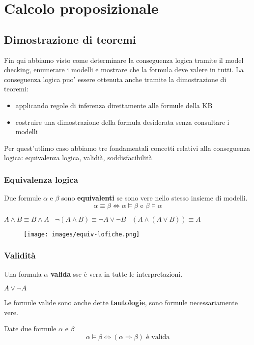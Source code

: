 \newpage
\section{Calcolo proposizionale}
\subsection{Dimostrazione di teoremi}
Fin qui abbiamo visto come determinare la conseguenza logica tramite il model checking,
enumerare i modelli e mostrare che la formula deve valere in tutti. La conseguenza logica puo’ essere ottenuta anche tramite la
dimostrazione di teoremi:
\begin{itemize}
    \item applicando regole di inferenza direttamente alle formule della KB
    \item costruire una dimostrazione della formula desiderata senza consultare i modelli
\end{itemize}
Per quest'utlimo caso abbiamo tre fondamentali concetti relativi alla conseguenza logica: equivalenza logica, validià, soddisfacibilità

\subsubsection{Equivalenza logica}
Due formule $\alpha$ e $\beta$ sono \textbf{equivalenti} se sono vere nello stesso insieme di modelli.
$$\alpha \equiv \beta \Leftrightarrow \alpha \models \beta \text{ e } \beta \models \alpha$$
\begin{example}
    $A \land B \equiv B \land A \hspace{10pt} \lnot(A \land B) \equiv \lnot A \lor \lnot B \hspace{10pt} (A \land (A \lor B)) \equiv A$ 
\end{example}
\begin{figure}[h!]
    \centering
    \texttt{[image: images/equiv-lofiche.png]}
\end{figure}

\subsubsection{Validità}
Una formula $\alpha$ \textbf{valida} sse è vera in tutte le interpretazioni.
\begin{example}
    $A \lor \lnot A$
\end{example}
\hspace{-15pt}Le formule valide sono anche dette \textbf{tautologie}, sono formule necessariamente vere.
\begin{theorem}
    Date due formule $\alpha$ e $\beta$ 
    $$\alpha \models \beta \Leftrightarrow (\alpha \Rightarrow \beta) \text{ è valida}$$
\end{theorem}

